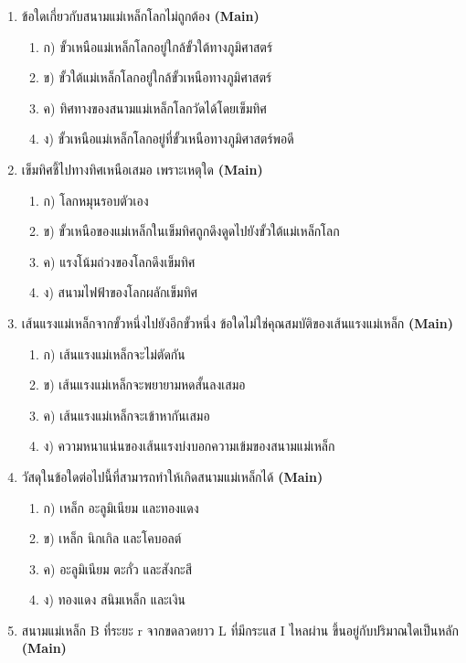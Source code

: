 \documentclass[12pt]{article}
\begin{document}
\begin{enumerate}[label=\arabic*.]
\item ข้อใดเกี่ยวกับสนามแม่เหล็กโลกไม่ถูกต้อง \hfill \textbf{\small (Main)}
\begin{enumerate}[label=)]
\item ก) ขั้วเหนือแม่เหล็กโลกอยู่ใกล้ขั้วใต้ทางภูมิศาสตร์
\item ข) ขั้วใต้แม่เหล็กโลกอยู่ใกล้ขั้วเหนือทางภูมิศาสตร์
\item ค) ทิศทางของสนามแม่เหล็กโลกวัดได้โดยเข็มทิศ
\item ง) ขั้วเหนือแม่เหล็กโลกอยู่ที่ขั้วเหนือทางภูมิศาสตร์พอดี
\end{enumerate}
\item เข็มทิศชี้ไปทางทิศเหนือเสมอ เพราะเหตุใด \hfill \textbf{\small (Main)}
\begin{enumerate}[label=)]
\item ก) โลกหมุนรอบตัวเอง
\item ข) ขั้วเหนือของแม่เหล็กในเข็มทิศถูกดึงดูดไปยังขั้วใต้แม่เหล็กโลก
\item ค) แรงโน้มถ่วงของโลกดึงเข็มทิศ
\item ง) สนามไฟฟ้าของโลกผลักเข็มทิศ
\end{enumerate}
\item เส้นแรงแม่เหล็กจากขั้วหนึ่งไปยังอีกขั้วหนึ่ง ข้อใดไม่ใช่คุณสมบัติของเส้นแรงแม่เหล็ก \hfill \textbf{\small (Main)}
\begin{enumerate}[label=)]
\item ก) เส้นแรงแม่เหล็กจะไม่ตัดกัน
\item ข) เส้นแรงแม่เหล็กจะพยายามหดสั้นลงเสมอ
\item ค) เส้นแรงแม่เหล็กจะเข้าหากันเสมอ
\item ง) ความหนาแน่นของเส้นแรงบ่งบอกความเข้มของสนามแม่เหล็ก
\end{enumerate}
\item วัสดุในข้อใดต่อไปนี้ที่สามารถทำให้เกิดสนามแม่เหล็กได้ \hfill \textbf{\small (Main)}
\begin{enumerate}[label=)]
\item ก) เหล็ก อะลูมิเนียม และทองแดง
\item ข) เหล็ก นิกเกิล และโคบอลต์
\item ค) อะลูมิเนียม ตะกั่ว และสังกะสี
\item ง) ทองแดง สนิมเหล็ก และเงิน
\end{enumerate}
\item สนามแม่เหล็ก B ที่ระยะ r จากขดลวดยาว L ที่มีกระแส I ไหลผ่าน ขึ้นอยู่กับปริมาณใดเป็นหลัก \hfill \textbf{\small (Main)}
\begin{enumerate}[label=)]

\end{enumerate}
\end{enumerate}
\end{document}

